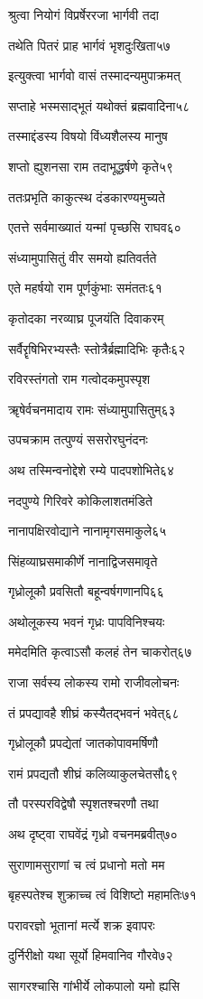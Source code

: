 श्रुत्वा नियोगं विप्रर्षेररजा भार्गवी तदा

तथेति पितरं प्राह भार्गवं भृशदुःखिता५७

इत्युक्त्वा भार्गवो वासं तस्मादन्यमुपाक्रमत्

सप्ताहे भस्मसाद्भूतं यथोक्तं ब्रह्मवादिना५८

तस्माद्दंडस्य विषयो विंध्यशैलस्य मानुष

शप्तो ह्युशनसा राम तदाभूद्धर्षणे कृते५९

ततःप्रभृति काकुत्स्थ दंडकारण्यमुच्यते

एतत्ते सर्वमाख्यातं यन्मां पृच्छसि राघव६०

संध्यामुपासितुं वीर समयो ह्यतिवर्तते

एते महर्षयो राम पूर्णकुंभाः समंततः६१

कृतोदका नरव्याघ्र पूजयंति दिवाकरम्

सर्वैरॄषिभिरभ्यस्तैः स्तोत्रैर्ब्रह्मादिभिः कृतैः६२

रविरस्तंगतो राम गत्वोदकमुपस्पृश

ॠषेर्वचनमादाय रामः संध्यामुपासितुम्६३

उपचक्राम तत्पुण्यं ससरोरघुनंदनः

अथ तस्मिन्वनोद्देशे रम्ये पादपशोभिते६४

नदपुण्ये गिरिवरे कोकिलाशतमंडिते

नानापक्षिरवोद्याने नानामृगसमाकुले६५

सिंहव्याघ्रसमाकीर्णे नानाद्विजसमावृते

गृध्रोलूकौ प्रवसितौ बहून्वर्षगणानपि६६

अथोलूकस्य भवनं गृध्रः पापविनिश्चयः

ममेदमिति कृत्वाऽसौ कलहं तेन चाकरोत्६७

राजा सर्वस्य लोकस्य रामो राजीवलोचनः

तं प्रपद्यावहै शीघ्रं कस्यैतद्भवनं भवेत्६८

गृध्रोलूकौ प्रपद्येतां जातकोपावमर्षिणौ

रामं प्रपद्यतौ शीघ्रं कलिव्याकुलचेतसौ६९

तौ परस्परविद्वेषौ स्पृशतश्चरणौ तथा

अथ दृष्ट्वा राघवेंद्रं गृध्रो वचनमब्रवीत्७०

सुराणामसुराणां च त्वं प्रधानो मतो मम

बृहस्पतेश्च शुक्राच्च त्वं विशिष्टो महामतिः७१

परावरज्ञो भूतानां मर्त्ये शक्र इवापरः

दुर्निरीक्षो यथा सूर्यो हिमवानिव गौरवे७२

सागरश्चासि गांभीर्ये लोकपालो यमो ह्यसि

